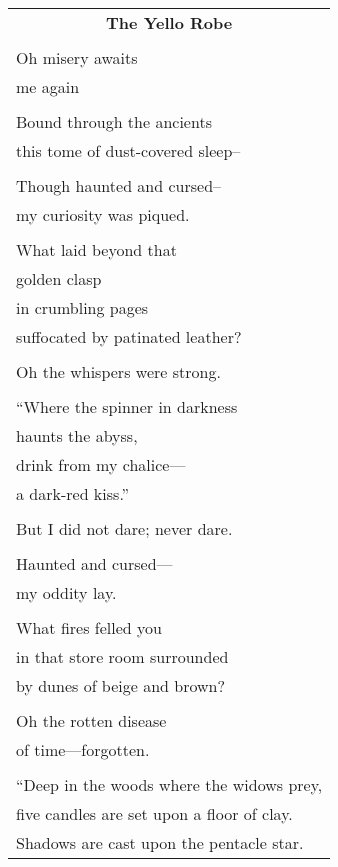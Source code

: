 \documentclass{article}
\begin{document}
\newcommand{\h}{\hspace*{4ex}}

\begin{center}
\begin{tabular}{l}
\multicolumn{1}{c}{\large\textbf{The Yello Robe}} \\
\\
Oh misery awaits \\
       me again \\
\\
Bound through the ancients \\
   this tome of dust-covered sleep-- \\
\\
Though haunted and cursed-- \\
    my curiosity was piqued. \\
\\
What laid beyond that \\
    golden clasp \\
in crumbling pages \\
    suffocated by patinated leather? \\
\\
Oh the whispers were strong. \\
\\
``Where the spinner in darkness \\
haunts the abyss, \\
drink from my chalice--- \\
a dark-red kiss.'' \\
\\
But I did not dare; never dare. \\
\\
Haunted and cursed--- \\
   my oddity lay. \\
\\
What fires felled you \\
in that store room surrounded \\
by dunes of beige and brown? \\
\\
Oh the rotten disease \\
  of time---forgotten. \\
\\
``Deep in the woods where the widows prey, \\
five candles are set upon a floor of clay. \\
Shadows are cast upon the pentacle star. \\

\end{tabular}
\end{center}
\end{document}
